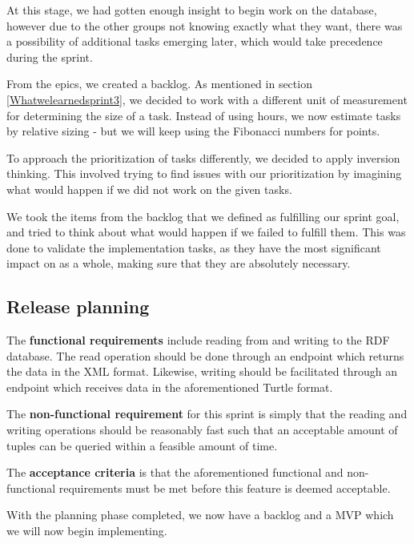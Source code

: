At this stage, we had gotten enough insight to begin work on the database, however due to the other groups not knowing exactly what they want, there was a possibility of additional tasks emerging later, which would take precedence during the sprint.


From the epics, we created a backlog. As mentioned in section \ref{Whatwelearnedsprint3}, we decided to work with a different unit of measurement for determining the size of a task.
Instead of using hours, we now estimate tasks by relative sizing - but we will keep using the Fibonacci numbers for points.

To approach the prioritization of tasks differently, we decided to apply inversion thinking\cite{InversionThinking}. This involved trying to find issues with our prioritization by imagining what would happen if we did not work on the given tasks. 

We took the items from the backlog that we defined as fulfilling our sprint goal, and tried to think about what would happen if we failed to fulfill them. 
This was done to validate the implementation tasks, as they have the most significant impact on \knox{} as a whole, making sure that they are absolutely necessary. 

\subsection*{Release planning}\label{acceptCriteriaSprint5}
The \textbf{functional requirements} include reading from and writing to the RDF database. 
The read operation should be done through an endpoint which returns the data in the XML format.
Likewise, writing should be facilitated through an endpoint which receives data in the aforementioned Turtle format.


The \textbf{non-functional requirement} for this sprint is simply that the reading and writing operations should be reasonably fast such that an acceptable amount of tuples can be queried within a feasible amount of time.


The \textbf{acceptance criteria} is that the aforementioned functional and non-functional requirements must be met before this feature is deemed acceptable. 


With the planning phase completed, we now have a backlog and a MVP which we will now begin implementing.